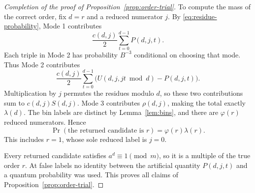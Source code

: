 \begin{proof}[Completion of the proof of Proposition~\ref{prop:order-trial}]
To compute the mass of the correct order, fix \(d=r\) and a reduced
numerator \(j\).  By \eqref{eq:residue-probability}, Mode 1 contributes
\[
 \frac{c(d,j)}2\sum_{t=0}^{d-1}P(d,j,t).
\]
Each triple in Mode 2 has probability \(B^{-3}\) conditional on choosing
that mode.  Thus Mode 2 contributes
\[
 \frac{c(d,j)}2\sum_{t=0}^{d-1}
       \bigl(U(d,j,jt\bmod d)-P(d,j,t)\bigr).
\]
Multiplication by \(j\) permutes the residues modulo \(d\), so these two
contributions sum to \(c(d,j)S(d,j)\).  Mode 3 contributes
\(\rho(d,j)\), making the total exactly \(\lambda(d)\).
The bin labels are distinct by Lemma~\ref{lem:bins}, and there are
\(\varphi(r)\) reduced numerators.  Hence
\[
 \Pr(\text{the returned candidate is }r)=\varphi(r)\lambda(r).
\]
This includes \(r=1\), whose sole reduced label is \(j=0\).

Every returned candidate satisfies \(a^d\equiv1\pmod m\), so it is a
multiple of the true order \(r\).  At false labels no identity between
the artificial quantity \(P(d,j,t)\) and a quantum probability was used.
This proves all claims of Proposition~\ref{prop:order-trial}.
\end{proof}

